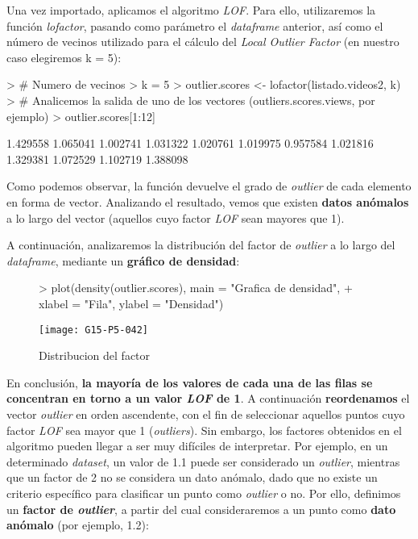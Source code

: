\documentclass [a4paper] {article}
\begin{document}
Una vez importado, aplicamos el algoritmo \textit{LOF}. Para ello, utilizaremos la función \textit{lofactor}, pasando como parámetro el \textit{dataframe} anterior, así como el número de vecinos utilizado para el cálculo del \textit{Local Outlier Factor} (en nuestro caso elegiremos k = 5):
{\footnotesize
\begin{Schunk}
\begin{Sinput}
> # Numero de vecinos
> k = 5
> outlier.scores <- lofactor(listado.videos2, k)
> # Analicemos la salida de uno de los vectores (outliers.scores.views, por ejemplo)
> outlier.scores[1:12]
\end{Sinput}
\begin{Soutput}
 [1] 1.429558 1.065041 1.002741 1.031322 1.020761 1.019975 0.957584 1.021816 1.329381 1.072529 1.102719 1.388098
\end{Soutput}
\end{Schunk}
}
Como podemos observar, la función devuelve el grado de \textit{outlier} de cada elemento en forma de vector. Analizando el resultado, vemos que existen \textbf{datos anómalos} a lo largo del vector (aquellos cuyo factor \textit{LOF} sean mayores que 1).

A continuación, analizaremos la distribución del factor de \textit{outlier} a lo largo del \textit{dataframe}, mediante un \textbf{gráfico de densidad}:

\begin{figure}[htbp!]
\centering
\begin{Schunk}
\begin{Sinput}
> plot(density(outlier.scores), main = "Grafica de densidad", 
+ xlabel = "Fila", ylabel = "Densidad")
\end{Sinput}
\end{Schunk}
\texttt{[image: G15-P5-042]}
\caption{Distribucion del factor}
\end{figure}

\newpage
En conclusión, \textbf{la mayoría de los valores de cada una de las filas se concentran en torno a un valor \textit{LOF} de 1}. A continuación \textbf{reordenamos} el vector \textit{outlier} en orden ascendente, con el fin de seleccionar aquellos puntos cuyo factor \textit{LOF} sea mayor que 1 (\textit{outliers}).
Sin embargo, los factores obtenidos en el algoritmo pueden llegar a ser muy difíciles de interpretar. Por ejemplo, en un determinado \textit{dataset}, un valor de 1.1 puede ser considerado un \textit{outlier}, mientras que un factor de 2 no se considera un dato anómalo, dado que no existe un criterio específico para clasificar un punto como \textit{outlier} o no. Por ello, definimos un \textbf{factor de \textit{outlier}}, a partir del cual consideraremos a un punto como \textbf{dato anómalo} (por ejemplo, 1.2):
\end{document}
